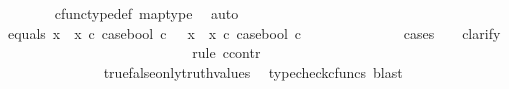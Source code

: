 \begin{isabellebody}
\ \ \ \ \ \ \isamarkupfalse%
\ cfunc{\isacharunderscore}{\kern0pt}type{\isacharunderscore}{\kern0pt}def\ map{\isacharunderscore}{\kern0pt}type\ \isamarkupfalse%
\ auto\isanewline
\ \ \ \ \isanewline
\ \ \ \ \isamarkupfalse%
\ equals{\isacharcolon}{\kern0pt}\ {\isachardoublequoteopen}{\isacharparenleft}{\kern0pt}x{}\ {\isasymamalg}\ x{}\ {\isasymcirc}\isactrlsub c\ case{\isacharunderscore}{\kern0pt}bool{\isacharparenright}{\kern0pt}\ {\isasymcirc}\isactrlsub c\ {\isasymomega}{}\ {\isacharequal}{\kern0pt}\ {\isacharparenleft}{\kern0pt}x{}\ {\isasymamalg}\ x{}\ {\isasymcirc}\isactrlsub c\ case{\isacharunderscore}{\kern0pt}bool{\isacharparenright}{\kern0pt}\ {\isasymcirc}\isactrlsub c\ {\isasymomega}{}{\isachardoublequoteclose}\isanewline
\ \ \ \ \isamarkupfalse%
\ {\isachardoublequoteopen}{\isasymomega}{}\ {\isacharequal}{\kern0pt}\ {\isasymomega}{}{\isachardoublequoteclose}\isanewline
\ \ \ \ \isamarkupfalse%
{\isacharparenleft}{\kern0pt}cases\ {\isachardoublequoteopen}{\isasymomega}{}\ {\isacharequal}{\kern0pt}\ {\isasymt}{\isachardoublequoteclose}{\isacharcomma}{\kern0pt}\ clarify{\isacharparenright}{\kern0pt}\isanewline
\ \ \ \ \ \ \isamarkupfalse%
\ {\isachardoublequoteopen}{\isasymomega}{}\ {\isacharequal}{\kern0pt}\ {\isasymt}{\isachardoublequoteclose}\isanewline
\ \ \ \ \ \ \isamarkupfalse%
\ {\isachardoublequoteopen}{\isasymt}\ {\isacharequal}{\kern0pt}\ {\isasymomega}{}{\isachardoublequoteclose}\isanewline
\ \ \ \ \ \ \isamarkupfalse%
{\isacharparenleft}{\kern0pt}rule\ ccontr{\isacharparenright}{\kern0pt}\isanewline
\ \ \ \ \ \ \ \ \isamarkupfalse%
\ {\isachardoublequoteopen}\ {\isasymt}\ {\isasymnoteq}\ {\isasymomega}{}{\isachardoublequoteclose}\isanewline
\ \ \ \ \ \ \ \ \isamarkupfalse%
\ \isamarkupfalse%
\ {\isachardoublequoteopen}{\isasymf}\ {\isacharequal}{\kern0pt}\ {\isasymomega}{}{\isachardoublequoteclose}\isanewline
\ \ \ \ \ \ \ \ \ \ \isamarkupfalse%
\ {\isacartoucheopen}{\isasymt}\ {\isasymnoteq}\ {\isasymomega}{}{\isacartoucheclose}\ true{\isacharunderscore}{\kern0pt}false{\isacharunderscore}{\kern0pt}only{\isacharunderscore}{\kern0pt}truth{\isacharunderscore}{\kern0pt}values\ \isamarkupfalse%
\ {\isacharparenleft}{\kern0pt}typecheck{\isacharunderscore}{\kern0pt}cfuncs{\isacharcomma}{\kern0pt}\ blast{\isacharparenright}{\kern0pt}\isanewline

\end{isabellebody}
